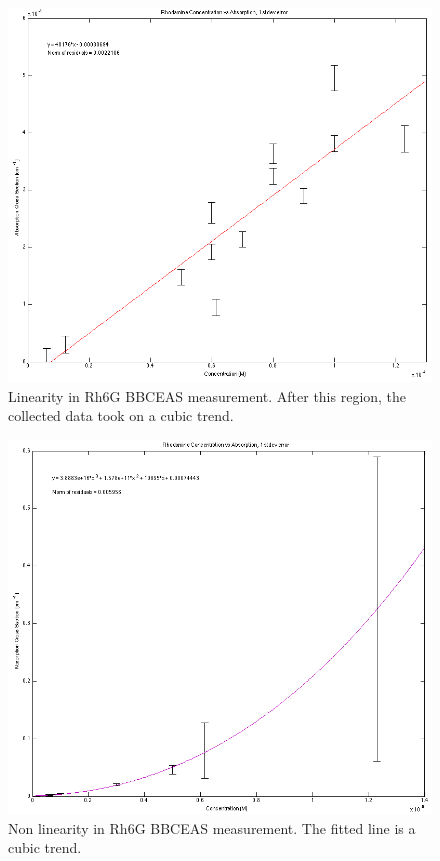 \begin{figure}
\begin{center}
\includegraphics[width=\textwidth]{figures/rhodamine_concentration_vs_conc_linear.png}
\end{center}
\caption{Linearity in Rh6G \ac{BBCEAS} measurement. After this region, the collected data took on a cubic trend.}
\label{fig:rh6g_lin}
\end{figure}

\begin{figure}
\begin{center}
\includegraphics[width=\textwidth]{figures/rhodamine_concentration_vs_conc_non_linear.png}
\end{center}
\caption{Non linearity in Rh6G \ac{BBCEAS} measurement. The fitted line is a cubic trend.}
\label{fig:rh6g_nonlin}
\end{figure}

